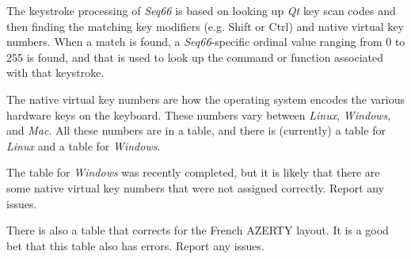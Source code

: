    The keystroke processing of \textsl{Seq66} is based on looking up
   \textsl{Qt} key scan codes and then finding the matching key modifiers (e.g.
   Shift or Ctrl) and native virtual key numbers.
   When a match is found, a \textsl{Seq66}-specific ordinal value ranging from
   0 to 255 is found, and that is used to look up the command or function
   associated with that keystroke.

   The native virtual key numbers are how the operating system
   encodes the various hardware keys on the keyboard.
   These numbers vary between
   \textsl{Linux},
   \textsl{Windows}, and
   \textsl{Mac}.
   All these numbers are in a table, and there is (currently)
   a table for \textsl{Linux} and a table for \textsl{Windows}.

   The table for \textsl{Windows} was recently completed, but
   it is likely that there are some native virtual key numbers
   that were not assigned correctly.
   Report any issues.

   There is also a table that corrects for
   the French AZERTY layout.
   It is a good bet that this table also has errors.
   Report any issues.

